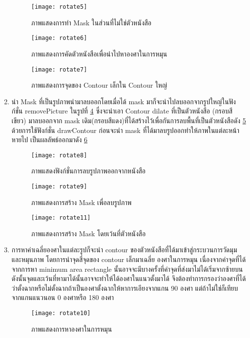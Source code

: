 \begin{enumerate}
    \begin{figure}[H]
        \centering
        \texttt{[image: rotate5]}
        \caption{ภาพแสดงการทำ Mask ในส่วนที่ไม่ใช่ตัวหนังสือ}\label{fig:rotate5}
    \end{figure}

    \begin{figure}[H]
        \centering
        \texttt{[image: rotate6]}
        \caption{ภาพแสดงการคัดตัวหนังสือเพื่อนำไปหาองศาในการหมุน}\label{fig:rotate6}
    \end{figure}

    \begin{figure}[H]
        \centering
        \texttt{[image: rotate7]}
        \caption{ภาพแสดงการจุดของ Contour เล็กใน Contour ใหญ่}\label{fig:rotate7}
    \end{figure}

    \item นำ Mask ที่เป็นรูปภาพนำมาลบออกโดยเมื่อได้ mask มาก็จะนำไปลบออกจากรูปใหญ่ในฟังก์ชั่น removePicture ในรูปที่ \ref{fig:rotate8}  ซึ่งจะนำเอา Contour dilate ที่เป็นตัวหนังสือ (กรอบสีเขียว) มาลบออกจาก mask เดิม(กรอบสีแดง)ที่ได้สร้างไว้เพื่อกันการลบพื้นที่เป็นตัวหนังสือดัง \ref{fig:rotate9} ด้วยการใช้ฟังก์ชั่น drawContour ก่อนจะนำ mask ที่ได้มาลบรูปออกทำให้ภาพในแต่ละหน้าหายไป เป็นผลลัพธ์ออกมาดัง \ref{fig:rotate11}
    
    \begin{figure}[H]
        \centering
        \texttt{[image: rotate8]}
        \caption{ภาพแสดงฟังก์ชั่นการลบรูปภาพออกจากหนังสือ}\label{fig:rotate8}
    \end{figure}

    \begin{figure}[H]
        \centering
        \texttt{[image: rotate9]}
        \caption{ภาพแสดงการสร้าง Mask เพื่อลบรูปภาพ}\label{fig:rotate9}
    \end{figure}

    \begin{figure}[H]
        \centering
        \texttt{[image: rotate11]}
        \caption{ภาพแสดงการสร้าง Mask โดยเว้นที่ตัวหนังสือ}\label{fig:rotate11}
    \end{figure}

    \item การหาค่าเฉลี่ยองศาในแต่ละรูปก็จะนำ contour ของตัวหนังสือที่ได้มาเข้าสู่กระบวนการวัดมุมและหมุนภาพ โดยการนำจุดสี่จุดของ contour เล็กมาเฉลี่ย องศาในการหมุน เนื่องจากค่าจุดที่ได้จากการหา minimum area rectangle นั้นอาจจะมีบางครั้งที่ค่าจุดที่ส่งมาไม่ได้เริ่มจากซ้ายบน ดังนั้นจุดและเว้นที่หามาได้นั้นอาจจะทำให้ได้องศาในแนวตั้งมาได้ จึงต้องทำการกรองว่าองศาที่ได้ว่าตั้งฉากหรือไม่ตั้งฉากถ้าเป็นองศาตั้งฉากให้หาการเอียงจากแกน 90 องศา แต่ถ้าไม่ใช่ก็เทียบจากแกนแนวนอน 0 องศาหรือ 180 องศา

    \begin{figure}[H]
        \centering
        \texttt{[image: rotate10]}
        \caption{ภาพแสดงการหาองศาในการหมุน}\label{fig:rotate10}
    \end{figure}
    
\end{enumerate}

